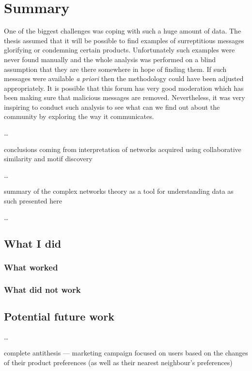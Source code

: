 \chapter{Summary}

  One of the biggest challenges was coping with such a huge amount of data. The thesis assumed that it will be possible to find examples of surreptitious messages glorifying or condemning certain products. Unfortunately such examples were never found manually and the whole analysis was performed on a blind assumption that they are there somewhere in hope of finding them. If such messages were available \emph{a priori} then the methodology could have been adjusted appropriately. It is possible that this forum has very good moderation which has been making sure that malicious messages are removed. Nevertheless, it was very inspiring to conduct such analysis to see what can we find out about the community by exploring the way it communicates.
  
  \ldots
  
  conclusions coming from interpretation of networks acquired using collaborative similarity and motif discovery
  
  \ldots
  
  summary of the complex networks theory as a tool for understanding data as such presented here
  
  \ldots


  \section{What I did}

    \subsection{What worked}

	\subsection{What did not work}

    \section{Potential future work}
    
      \ldots
      
      complete antithesis --- marketing campaign focused on users based on the changes of their product preferences (as well as their nearest neighbour's preferences)
      
